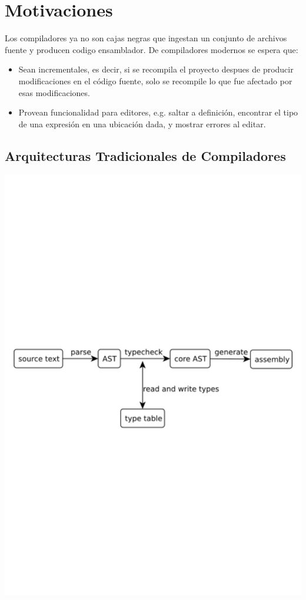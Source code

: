 \documentclass[12pt, a4paper]{report}
\begin{document}
\section*{Motivaciones}

Los compiladores ya no son cajas negras que ingestan un conjunto de archivos
fuente y producen codigo ensamblador. De compiladores modernos se espera que:

\begin{itemize}[noitemsep]

\item Sean incrementales, es decir, si se recompila el proyecto despues de
producir modificaciones en el código fuente, solo se recompile lo que fue
afectado por esas modificaciones.

\item Provean funcionalidad para editores, e.g. saltar a definición, encontrar
el tipo de una expresión en una ubicación dada, y mostrar errores al editar.

\end{itemize}

\subsection*{Arquitecturas Tradicionales de Compiladores}

\noindent
\includegraphics[width=\textwidth]{olle_trad_comp_arq}
\cite{olle_query_based}
\end{document}
